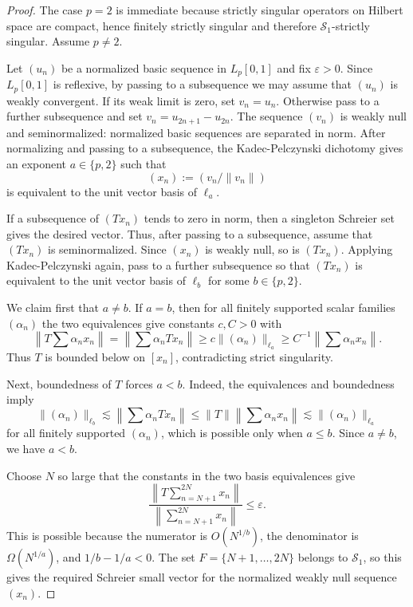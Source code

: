 \documentclass[11pt]{article}
\newcommand{\Lp}{L_p[0,1]}
\newcommand{\Sone}{\mathcal S_1}
\begin{document}
\begin{proof}
The case $p=2$ is immediate because strictly singular operators on Hilbert
space are compact, hence finitely strictly singular and therefore
$\Sone$-strictly singular.  Assume $p\ne2$.

Let $(u_n)$ be a normalized basic sequence in $\Lp$ and fix
$\varepsilon>0$.  Since $\Lp$ is reflexive, by passing to a subsequence we may
assume that $(u_n)$ is weakly convergent.  If its weak limit is zero, set
$v_n=u_n$.  Otherwise pass to a further subsequence and set
$v_n=u_{2n+1}-u_{2n}$.  The sequence $(v_n)$ is weakly null and
seminormalized: normalized basic sequences are separated in norm.  After
normalizing and passing to a subsequence, the Kadec-Pelczynski dichotomy
\cite{KP} gives an exponent $a\in\{p,2\}$ such that
\[
  (x_n):=\left(v_n/\|v_n\|\right)
\]
is equivalent to the unit vector basis of $\ell_a$.

If a subsequence of $(Tx_n)$ tends to zero in norm, then a singleton Schreier
set gives the desired vector.  Thus, after passing to a subsequence, assume
that $(Tx_n)$ is seminormalized.  Since $(x_n)$ is weakly null, so is
$(Tx_n)$.  Applying Kadec-Pelczynski again, pass to a further subsequence so
that $(Tx_n)$ is equivalent to the unit vector basis of $\ell_b$ for some
$b\in\{p,2\}$.

We claim first that $a\ne b$.  If $a=b$, then for all finitely supported
scalar families $(\alpha_n)$ the two equivalences give constants $c,C>0$ with
\[
  \left\|T\sum \alpha_n x_n\right\|
  =\left\|\sum \alpha_n Tx_n\right\|
  \geq c\|(\alpha_n)\|_{\ell_a}
  \geq C^{-1}\left\|\sum \alpha_n x_n\right\|.
\]
Thus $T$ is bounded below on $[x_n]$, contradicting strict singularity.

Next, boundedness of $T$ forces $a<b$.  Indeed, the equivalences and
boundedness imply
\[
  \|(\alpha_n)\|_{\ell_b}
  \lesssim
  \left\|\sum \alpha_n Tx_n\right\|
  \leq
  \|T\|\left\|\sum \alpha_n x_n\right\|
  \lesssim
  \|(\alpha_n)\|_{\ell_a}
\]
for all finitely supported $(\alpha_n)$, which is possible only when
$a\leq b$.  Since $a\ne b$, we have $a<b$.

Choose $N$ so large that the constants in the two basis equivalences give
\[
  \frac{\left\|T\sum_{n=N+1}^{2N} x_n\right\|}
       {\left\|\sum_{n=N+1}^{2N} x_n\right\|}
  \leq \varepsilon .
\]
This is possible because the numerator is $O(N^{1/b})$, the denominator is
$\Omega(N^{1/a})$, and $1/b-1/a<0$.  The set
$F=\{N+1,\ldots,2N\}$ belongs to $\Sone$, so this gives the required Schreier
small vector for the normalized weakly null sequence $(x_n)$.


\end{proof}
\end{document}
